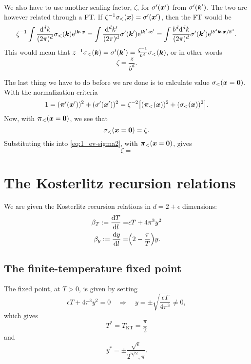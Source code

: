 \documentclass[11pt,letter, swedish, english
]{article}
\begin{document}
We also have to use another scaling factor, $\zeta$, for
$\sigma'(\vb*x')$ from $\sigma'(\vb*k')$. The two are however related
through a FT. If $\zeta^{-1}\sigma_<(\vb*x) = \sigma'(\vb*x')$, then
the FT would be
\begin{equation}
\zeta^{-1}
\int\frac{\rd^dk}{(2\pi)^d}\sigma_<(\vb*k)\ee^{\ii\vb*k\vdot\vb*x}
=\int\frac{\rd^dk'}{(2\pi)^d}
\sigma'(\vb*k')\ee^{\ii\vb*k'\vdot\vb*x'}
=\int\frac{b^d\rd^dk}{(2\pi)^d}
\sigma'(\vb*k')\ee^{\ii b^d\vb*k\vdot\vb*x/b^d}.
\end{equation}
This would mean that
$ z^{-1}\sigma_<(\vb*k) = \sigma'(\vb*k') 
= \frac{\zeta^{-1}}{b^d}\sigma_<(\vb*k)$, 
or in other words
\begin{equation}
\zeta = \frac{z}{b^d}.
\end{equation}

The last thing we have to do before we are done is to calculate value
$\sigma_<(\vb*x=\vb*0)$. With the normalization criteria 
\begin{equation}
1 = (\vb*\pi'(\vb*x'))^2 +(\sigma'(\vb*x'))^2
= \zeta^{-2}\qty[ (\vb*\pi_<(\vb*x))^2 +(\sigma_<(\vb*x))^2].
\end{equation}
Now, with $\vb*\pi_<(\vb*x=\vb*0)$, we see that
\begin{equation}
\sigma_<(\vb*x=\vb*0) = \zeta.
\end{equation}
Substituting this into \eqref{eq:1_ev-sigma2}, with
$\vb*\pi_<(\vb*x=\vb*0)$, gives 
\begin{equation}
\zeta = 
\end{equation}


\section{The Kosterlitz recursion relations}
\newcommand{\TKT}{T_{\text{KT}}}

We are given the Kosterlitz recursion relations in $d=2+\epsilon$
dimensions:
\begin{align}
\label{eq:2_dT/dl}
\beta_T := \dv{T}{l} =& \epsilon T +4\pi^3y^2\\
\label{eq:2_dy/dl}
\beta_y := \dv{y}{l} =& \qty(2 -\frac{\pi}{T})y.
\end{align}


\subsection{The finite-temperature fixed point}
The fixed point, at $T>0$, is given by setting
\begin{equation}
\epsilon T +4\pi^3y^2 = 0
\quad\Longrightarrow\quad
y = \pm\sqrt{\frac{\epsilon T}{4\pi^3}} \neq0,
\end{equation}
which gives
\begin{equation}
T^* = \TKT = \frac{\pi}{2}
\end{equation}
and 
\begin{equation}
y^* = \pm\frac{\sqrt{\epsilon}}{2^{5/2},\pi}.
\end{equation}
\end{document}
